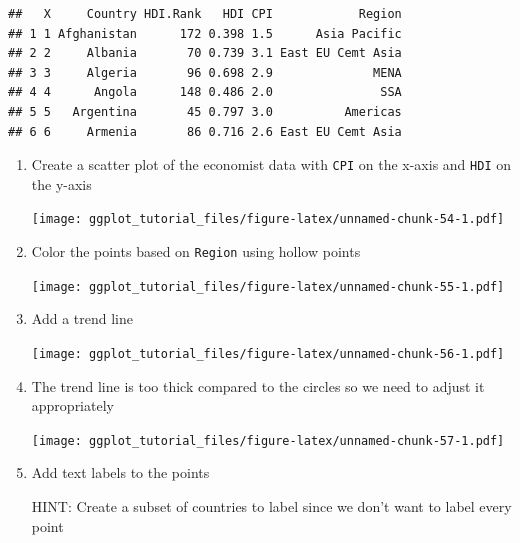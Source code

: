 \documentclass[]{article}
\newenvironment{Shaded}{\begin{snugshade}}{\end{snugshade}}
\newcommand{\KeywordTok}[1]{\textcolor[rgb]{0.13,0.29,0.53}{\textbf{{#1}}}}
\newcommand{\StringTok}[1]{\textcolor[rgb]{0.31,0.60,0.02}{{#1}}}
\newcommand{\NormalTok}[1]{{#1}}
\theoremstyle{definition}
\theoremstyle{definition}
\theoremstyle{definition}
\theoremstyle{remark}
\begin{document}
\begin{verbatim}
##   X     Country HDI.Rank   HDI CPI            Region
## 1 1 Afghanistan      172 0.398 1.5      Asia Pacific
## 2 2     Albania       70 0.739 3.1 East EU Cemt Asia
## 3 3     Algeria       96 0.698 2.9              MENA
## 4 4      Angola      148 0.486 2.0               SSA
## 5 5   Argentina       45 0.797 3.0          Americas
## 6 6     Armenia       86 0.716 2.6 East EU Cemt Asia
\end{verbatim}

\begin{enumerate}
\def\labelenumi{\arabic{enumi}.}
\item
  Create a scatter plot of the economist data with \texttt{CPI} on the
  x-axis and \texttt{HDI} on the y-axis

  \texttt{[image: ggplot\_tutorial\_files/figure-latex/unnamed-chunk-54-1.pdf]}
\item
  Color the points based on \texttt{Region} using hollow points

  \texttt{[image: ggplot\_tutorial\_files/figure-latex/unnamed-chunk-55-1.pdf]}
\item
  Add a trend line

  \texttt{[image: ggplot\_tutorial\_files/figure-latex/unnamed-chunk-56-1.pdf]}
\item
  The trend line is too thick compared to the circles so we need to
  adjust it appropriately

  \texttt{[image: ggplot\_tutorial\_files/figure-latex/unnamed-chunk-57-1.pdf]}
\item
  Add text labels to the points

  HINT: Create a subset of countries to label since we don't want to
  label every point

\begin{Shaded}
\end{Shaded}


\end{enumerate}
\end{document}
